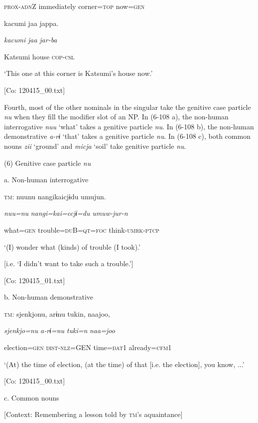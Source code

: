       \textsc{prox}-\textsc{adn}Z  immediately  corner=\textsc{top}  now=\textsc{gen}

      kacumi  jaa  jappa.

      \textit{kacumi}  \textit{jaa}  \textit{jar-ba}

      Katsumi  house  \textsc{cop}-\textsc{csl}

      ‘This one at this corner is Katsumi’s house now.’

      [Co: 120415\_00.txt]

  Fourth, most of the other nominals in the singular take the genitive case particle \textit{nu} when they fill the modifier slot of an NP. In (6-108 a), the non-human interrogative \textit{nuu} ‘what’ takes a genitive particle \textit{nu}. In (6-108 b), the non-human demonstrative \textit{a-rɨ} ‘that’ takes a genitive particle \textit{nu}. In (6-108 c), both common nouns \textit{zii} ‘ground’ and \textit{micja} ‘soil’ take genitive particle \textit{nu}.

(6)  Genitive case particle \textit{nu}

  a.  Non-human interrogative

    \textsc{tm}:  nuunu  nangikaicjɨdu  umujun.

      \textit{nuu=nu}  \textit{nangi=kai=ccjɨ=du}  \textit{umuw-jur-n}

      what=\textsc{gen}  trouble=\textsc{du}B=\textsc{qt}=\textsc{foc}  think-\textsc{umrk}-\textsc{ptcp}

      ‘(I) wonder what (kinds) of trouble (I took).’

[i.e. ‘I didn’t want to take such a trouble.’]

      [Co: 120415\_01.txt]

  b.  Non-human demonstrative

    \textsc{tm}:  {\textbar}sjenkjo{\textbar}nu,  arɨnu  tukin,  naajoo,

      \textit{sjenkjo=nu}  \textit{a-rɨ=nu}  \textit{tuki=n}  \textit{naa=joo}

      election=\textsc{gen}  \textsc{dist}-\textsc{nlz}=GEN  time=\textsc{dat}1  already=\textsc{cfm}1

      ‘(At) the time of election, (at the time) of that [i.e. the election], you know, ...’

      [Co: 120415\_00.txt]

  c.  Common nouns

    [Context: Remembering a lesson told by \textsc{tm}’s aquaintance]

